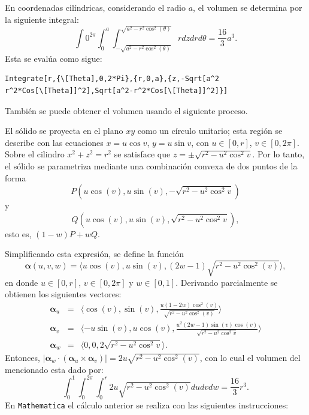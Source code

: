 En coordenadas cilíndricas, considerando el radio $a$, el volumen se determina por la siguiente integral:
%
\[\int 0^{2 \pi }\int _0^a\int _{-\sqrt{a^2-r^2 \cos ^2(\theta)}}^{\sqrt{a^2-r^2\cos^2(\theta)}}rdzdrd\theta=\frac{16}{3}a^{3}.\]
%
Esta se evalúa como sigue:

\begin{tcolorbox}[title=\bf Instrucción en \verb"Mathematica"]\begin{Verbatim}[formatcom=\letraverbatim]
Integrate[r,{\[Theta],0,2*Pi},{r,0,a},{z,-Sqrt[a^2
r^2*Cos[\[Theta]]^2],Sqrt[a^2-r^2*Cos[\[Theta]]^2]}]
\end{Verbatim}
\end{tcolorbox}

También se puede obtener el volumen usando el siguiente proceso.

El sólido se proyecta en el plano $xy$ como un círculo unitario; esta región se describe con las ecuaciones $x=u\cos v$, $y=u\sin v$, con $u \in [0,r]$, $v\in [0,2\pi]$.
Sobre el cilindro $x^2+z^2=r^2$ se satisface que $z =\pm \sqrt{r^2-u^2 \cos ^2v}$.
Por lo tanto, el sólido se parametriza mediante una combinación convexa de dos puntos de la forma
%
\[P(u \cos (v),u \sin (v),-\sqrt{r^2-u^2 \cos ^2v})\] y \[Q(u \cos (v),u \sin (v),\sqrt{r^2-u^2 \cos ^2v}),\]
esto es, $(1-w)P+wQ$.

Simplificando esta expresión, se define la función
%
\[{\boldsymbol \alpha}(u,v,w)= \langle u \cos (v),u \sin (v),(2w-1)\sqrt{r^2-u^2 \cos ^2(v)} \rangle,\]
%
en donde $u\in [0,r]$, $v\in [0,2\pi]$ y $w\in [0,1]$.
Derivando parcialmente se obtienen los siguientes vectores:
\begin{eqnarray*}
{\boldsymbol \alpha}_u &=& \langle \cos(v), \sin(v), \frac{u(1-2w)\cos^2(v)}{\sqrt{r^2-u^2 \cos^2(v)}} \rangle \\
{\boldsymbol \alpha}_v &=& \langle-u \sin(v), u\cos(v), \frac{u^2(2w-1)\sin(v)\cos(v)}{\sqrt{r^2-u^2 \cos^2v}}\rangle \\
{\boldsymbol \alpha}_w &=& \langle 0, 0, 2\sqrt{r^2-u^2 \cos^2v}\rangle.
\end{eqnarray*}
Entonces, $|{\boldsymbol \alpha}_w \cdot ({\boldsymbol \alpha}_u \times {\boldsymbol \alpha}_v)| = 2u\sqrt{r^2-u^2 \cos^2(v)}$, con lo cual el volumen del mencionado esta dado por:
\[\int_0^1 \int_0^{2\pi} \int_0^r 2u\sqrt{r^2-u^2 \cos^2(v)} du dv dw= \frac{16}{3}r^3.\]
En \verb"Mathematica" el cálculo anterior se realiza con las siguientes instrucciones:

